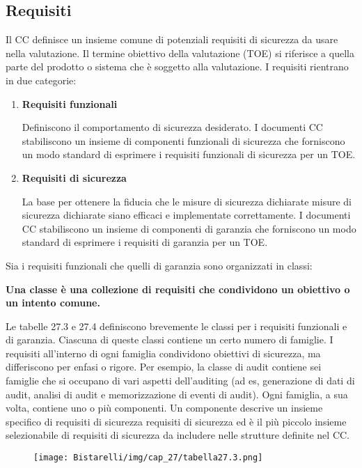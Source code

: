 \subsection{Requisiti}
Il CC definisce un insieme comune di potenziali requisiti di sicurezza da usare nella valutazione. Il termine obiettivo della valutazione (TOE) si riferisce a quella parte del prodotto o sistema che è soggetto alla valutazione. I requisiti rientrano in due categorie:
\begin{enumerate}
    \item \textbf{Requisiti funzionali}
    
    Definiscono il comportamento di sicurezza desiderato. I documenti CC stabiliscono un insieme di componenti funzionali di sicurezza che forniscono un modo standard di esprimere i requisiti funzionali di sicurezza per un TOE.
    
    \item \textbf{Requisiti di sicurezza}
    
    La base per ottenere la fiducia che le misure di sicurezza dichiarate misure di sicurezza dichiarate siano efficaci e implementate correttamente. I documenti CC stabiliscono un insieme di componenti di garanzia che forniscono un modo standard di esprimere i requisiti di garanzia per un TOE.
\end{enumerate}

Sia i requisiti funzionali che quelli di garanzia sono organizzati in classi:

\begin{center}
    \textbf{Una classe è una collezione di requisiti che condividono un obiettivo o un intento comune.}
\end{center}

Le tabelle 27.3 e 27.4 definiscono brevemente le classi per i requisiti funzionali e di garanzia. Ciascuna di queste classi contiene un certo numero di famiglie. I requisiti all'interno di ogni famiglia condividono obiettivi di sicurezza, ma differiscono per enfasi o rigore. Per esempio, la classe di audit contiene sei famiglie che si occupano di vari aspetti dell'auditing (ad es, generazione di dati di audit, analisi di audit e memorizzazione di eventi di audit). Ogni famiglia, a sua volta, contiene uno o più componenti. Un componente descrive un insieme specifico di requisiti di sicurezza requisiti di sicurezza ed è il più piccolo insieme selezionabile di requisiti di sicurezza da includere nelle strutture definite nel CC.

\begin{figure}[H]
	\centering
    \texttt{[image: Bistarelli/img/cap\_27/tabella27.3.png]}
\end{figure}

